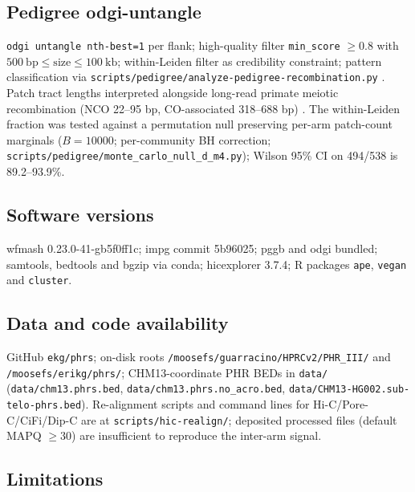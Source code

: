 \documentclass[pdflatex,mathphys]{jnl}
\begin{document}
\subsection*{Pedigree odgi-untangle}

\texttt{odgi untangle nth-best=1} per flank; high-quality filter
\texttt{min\_score} $\geq 0.8$ with $500\ \mathrm{bp} \leq \mathrm{size} \leq 100\ \mathrm{kb}$;
within-Leiden filter as credibility constraint; pattern classification via
\texttt{scripts/pedigree/analyze-pedigree-recombination.py}
.
Patch tract lengths interpreted alongside long-read primate meiotic
recombination (NCO 22--95 bp, CO-associated 318--688 bp)
.
The within-Leiden fraction was tested against a permutation null preserving
per-arm patch-count marginals ($B = 10000$; per-community BH correction;
\texttt{scripts/pedigree/monte\_carlo\_null\_d\_m4.py}); Wilson 95\% CI on
494/538 is 89.2--93.9\%.

\subsection*{Software versions}

wfmash 0.23.0-41-gb5f0ff1c; impg commit 5b96025; pggb and odgi bundled;
samtools, bedtools and bgzip via conda; hicexplorer 3.7.4; R packages
\texttt{ape}, \texttt{vegan} and \texttt{cluster}.

\subsection*{Data and code availability}

GitHub \texttt{ekg/phrs}; on-disk roots
\texttt{/moosefs/guarracino/HPRCv2/PHR\_III/} and \texttt{/moosefs/erikg/phrs/};
CHM13-coordinate PHR BEDs in \texttt{data/} (\texttt{data/chm13.phrs.bed},
\texttt{data/chm13.phrs.no\_acro.bed},
\texttt{data/CHM13-HG002.sub-telo-phrs.bed}).
Re-alignment scripts and command lines for Hi-C/Pore-C/CiFi/Dip-C are at
\texttt{scripts/hic-realign/}; deposited processed files (default MAPQ
$\geq 30$) are insufficient to reproduce the inter-arm signal.

\subsection*{Limitations}
\end{document}
